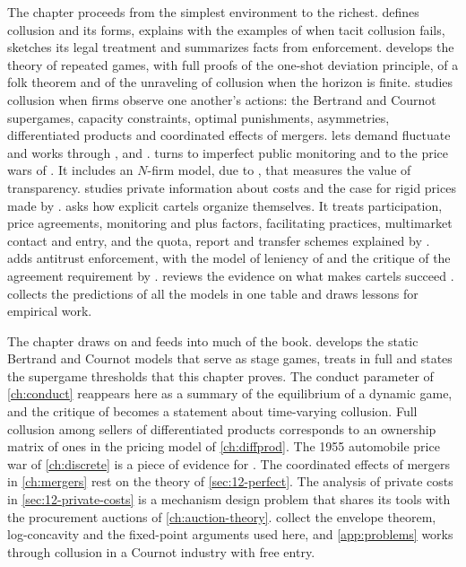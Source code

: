 The chapter proceeds from the simplest environment to the richest.  defines collusion and its
forms, explains with the examples of \citet{MarshallMarx2012} when tacit collusion fails, sketches its legal
treatment and summarizes facts from enforcement.  develops the theory of repeated games, with
full proofs of the one-shot deviation principle, of a folk theorem and of the unraveling of collusion when the
horizon is finite.  studies collusion when firms observe one another's actions: the Bertrand
and Cournot supergames, capacity constraints, optimal punishments, asymmetries, differentiated products and
coordinated effects of mergers.  lets demand fluctuate and works through
\citet{RotembergSaloner1986}, \citet{HaltiwangerHarrington1991} and \citet{BagwellStaiger1997}.
 turns to imperfect public monitoring and to the price wars of \citet{GreenPorter1984}. It
includes an $N$-firm model, due to \citet{AskerNocke2021}, that measures the value of transparency.
 studies private information about costs and the case for rigid prices made by
\citet{AtheyBagwellSanchirico2004}.  asks how explicit cartels organize themselves. It treats
participation, price agreements, monitoring and plus factors, facilitating practices, multimarket contact and entry,
and the quota, report and transfer schemes explained by \citet{HarringtonSkrzypacz2011}.  adds
antitrust enforcement, with the model of leniency of \citet{ChenRey2013} and the critique of the agreement
requirement by \citet{Kaplow2013}.  reviews the evidence on what makes cartels succeed
\citep{LevensteinSuslow2006}.  collects the predictions of all the models in one table and
draws lessons for empirical work.

The chapter draws on and feeds into much of the book.  develops the static Bertrand and Cournot
models that serve as stage games, treats \citet{Stigler1964} in full and states the supergame thresholds that this
chapter proves. The conduct parameter of \cref{ch:conduct} reappears here as a summary of the equilibrium of a dynamic
game, and the critique of \citet{Corts1999} becomes a statement about time-varying collusion. Full collusion among
sellers of differentiated products corresponds to an ownership matrix of ones in the pricing model of
\cref{ch:diffprod}. The 1955 automobile price war of \cref{ch:discrete} is a piece of evidence for
\citet{RotembergSaloner1986}. The coordinated effects of mergers in \cref{ch:mergers} rest on the theory of
\cref{sec:12-perfect}. The analysis of private costs in \cref{sec:12-private-costs} is a mechanism design problem
that shares its tools with the procurement auctions of \cref{ch:auction-theory}.  collect the
envelope theorem, log-concavity and the fixed-point arguments used here, and \cref{app:problems} works through
collusion in a Cournot industry with free entry.


